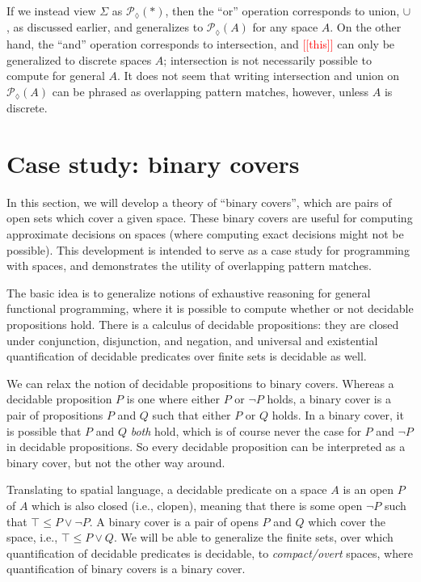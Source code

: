\documentclass[conference]{IEEEtran}
\newcommand{\PLower}{\mathcal{P}_\lozenge}
\newcommand{\One}{\ast}
\newcommand{\note}[1]{\textcolor{red}{[[{#1}]]}}
\begin{document}
If we instead view $\Sigma$ as $\PLower(\One)$, then the ``or'' operation corresponds to union, $\cup$, as discussed earlier, and generalizes to $\PLower(A)$ for any space $A$. On the other hand, the ``and'' operation corresponds to intersection, and \note{this} can only be generalized to discrete spaces $A$; intersection is not necessarily possible to compute for general $A$. It does not seem that writing intersection and union on $\PLower(A)$ can be phrased as overlapping pattern matches, however, unless $A$ is discrete.

\section{Case study: binary covers}
\label{s:bcover}

In this section, we will develop a theory of ``binary covers'', which are pairs of open sets which cover a given space. These binary covers are useful for computing approximate decisions on spaces (where computing exact decisions might not be possible). This development is intended to serve as a case study for programming with spaces, and demonstrates the utility of overlapping pattern matches.

The basic idea is to generalize notions of exhaustive reasoning for general functional programming, where it is possible to compute whether or not decidable propositions hold. There is a calculus of decidable propositions: they are closed under conjunction, disjunction, and negation, and universal and existential quantification of decidable predicates over finite sets is decidable as well.

We can relax the notion of decidable propositions to binary covers. Whereas a decidable proposition $P$ is one where either $P$ or $\neg P$ holds, a binary cover is a pair of propositions $P$ and $Q$ such that either $P$ or $Q$ holds. In a binary cover, it is possible that $P$ and $Q$ \emph{both} hold, which is of course never the case for $P$ and $\neg P$ in decidable propositions. So every decidable proposition can be interpreted as a binary cover, but not the other way around.

Translating to spatial language, a decidable predicate on a space $A$ is an open $P$ of $A$ which is also closed (i.e., clopen), meaning that there is some open $\neg P$ such that $\top \le P \vee \neg P$. A binary cover is a pair of opens $P$ and $Q$ which cover the space, i.e., $\top \le P \vee Q$. We will be able to generalize the finite sets, over which quantification of decidable predicates is decidable, to \emph{compact/overt} spaces, where quantification of binary covers is a binary cover.
\end{document}
